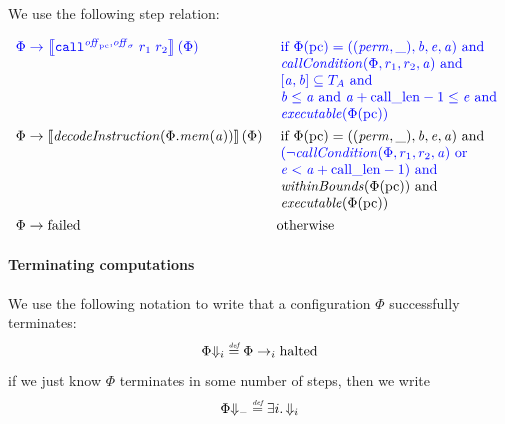 \documentclass[a4paper]{article}
\begin{document}
We use the following step relation:

\begin{align*}
  \src{\Phi} & \; \src{\step \sem{\scall{\offpc,\offsigma}{r_1}{r_2}}(\Phi)} &  &\sourcecolor\left.\arraycolsep=0pt
                                                  \begin{array}[t]{l}
                                                    \text{if }\Phi(\pcreg) 
= ((\perm,\_),\baddr,\eaddr,\aaddr) \tand \\
                                                    \callCond{\Phi,r_1,r_2,\aaddr} \tand\\
                                                    \lbrack \aaddr ,\baddr \rbrack \subseteq \ta \tand \\
                                                    \baddr \leq \aaddr \tand \aaddr + \calllen-1 \leq \eaddr \tand \\
                                                    \exec{\Phi(\pcreg)}
                                                  \end{array}\right.\\
  \Phi & \step \sem{\decInstr{\Phi.\mem(\aaddr)}}(\Phi) & &\left.\arraycolsep=0pt
                                                  \begin{array}[t]{l}
                                                    \text{if }\Phi(\pcreg) = ((\perm,\_),\baddr,\eaddr,\aaddr) \tand \\
                                                    \src{(\neg\callCond{\Phi,r_1,r_2,\aaddr} \tor}\\
                                                    \src{\eaddr < \aaddr + \calllen-1) \tand} \\
                                                    \withinBounds{\Phi(\pcreg)} \tand \\
                                                    \exec{\Phi(\pcreg)}
                                                  \end{array}\right.\\
  \Phi& \step \failed & & \totherwise
\end{align*}

\paragraph{Terminating computations}
We use the following notation to write that a configuration $\Phi$ successfully terminates:
\[
  \Phi\term[i] \defeq \Phi \nstep[i] \halted
\]
if we just know $\Phi$ terminates in some number of steps, then we write
\[
  \Phi\term \defeq \exists i \ldotp \term[i]
\]
\end{document}

